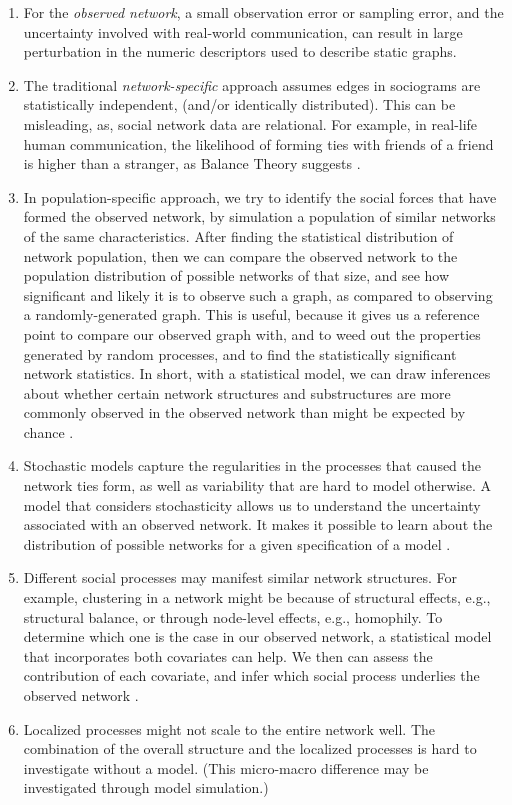 \documentclass[11pt]{report}
\begin{document}
\begin{enumerate}

\item For the \textit{observed network}, a small observation error or sampling error, and the uncertainty involved with real-world communication, can result in large perturbation in the numeric descriptors used to describe static graphs. 

\item The traditional \textit{network-specific} approach assumes edges in sociograms are statistically independent, (and/or identically distributed). This can be misleading, as, social network data are relational. For example, in real-life human communication, the likelihood of forming ties with friends of a friend is higher than a stranger, as Balance Theory suggests \cite{Heider}. 

\item In population-specific approach, we try to identify the social forces that have formed the observed network, by simulation a population of similar networks of the same characteristics. After finding the statistical distribution of network population, then we can compare the observed network to the population distribution of possible networks of that size, and see how significant and likely it is to observe such a graph, as compared to observing a randomly-generated graph. This is useful, because it gives us a reference point to compare our observed graph with, and to weed out the properties generated by random processes, and to find the statistically significant network statistics. In short, with a statistical model, we can draw inferences about whether certain network structures and substructures are more commonly observed in the observed network than might be expected by chance \cite{Robins}. 

\item Stochastic models capture the regularities in the processes that caused the network ties form, as well as variability that are hard to model otherwise. A model that considers stochasticity allows us to understand the uncertainty associated with an observed network. It makes it possible to learn about the distribution of possible networks for a given specification of a model \cite{Robins}.

\item Different social processes may manifest similar network structures. For example, clustering in a network might be because of structural effects, e.g., structural balance, or through node-level effects, e.g., homophily. To determine which one is the case in our observed network, a statistical model that incorporates both covariates can help. We then can assess the contribution of each covariate, and infer which social process underlies the observed network \cite{Robins}. 

\item  Localized processes might not scale to the entire network well. The combination of the overall structure and the localized processes is hard to investigate without a model. (This micro-macro difference may be investigated through model simulation.)\cite{Robins}

\end{enumerate}
\end{document}
